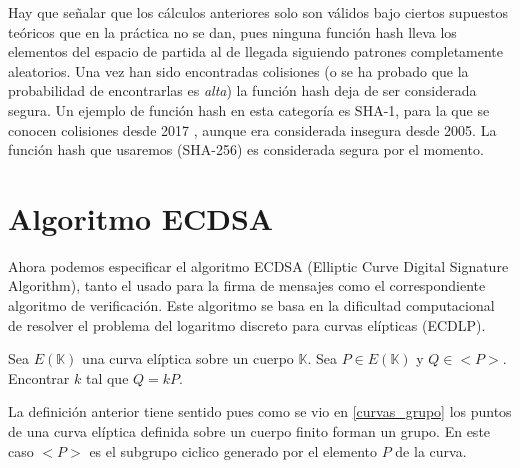 Hay que señalar que los cálculos anteriores solo son válidos bajo ciertos supuestos teóricos que en la práctica no se dan, pues ninguna función hash lleva los elementos del espacio de partida al de llegada siguiendo patrones completamente aleatorios. Una vez han sido encontradas colisiones (o se ha probado que la probabilidad de encontrarlas es \textit{alta}) la función hash deja de ser considerada segura. Un ejemplo de función hash en esta categoría es SHA-1, para la que se conocen colisiones desde 2017 \citep{sha-1}, aunque era considerada insegura desde 2005. 
La función hash que usaremos (SHA-256) es considerada segura por el momento.








\section{Algoritmo ECDSA}

Ahora podemos especificar el algoritmo ECDSA (Elliptic Curve Digital Signature Algorithm)\citep{elliptic_cripto}, tanto el usado para la firma de mensajes como el correspondiente algoritmo de verificación. Este algoritmo se basa en la dificultad computacional de resolver el problema del logaritmo discreto para curvas elípticas (ECDLP).

\theoremstyle{definition}\begin{definition}\label{ecdlp} Sea $E(\mathbb{K})$ una curva elíptica sobre un cuerpo $\mathbb{K}$. Sea $P \in E(\mathbb{K})$ y $Q \in <P>$. Encontrar $k$ tal que $Q= kP$. \end{definition}

La definición anterior tiene sentido pues como se vio en \ref{curvas_grupo} los puntos de una curva elíptica definida sobre un cuerpo finito forman un grupo. En este caso $<P>$ es el subgrupo ciclico generado por el elemento $P$ de la curva. 

